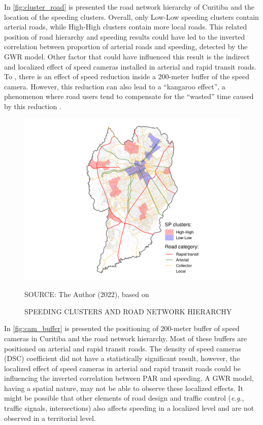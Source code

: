 In \autoref{fig:cluster_road} is presented the road network hierarchy of Curitiba and the location of the speeding clusters. Overall, only Low-Low speeding clusters contain arterial roads, while High-High clusters contain more local roads. This related position of road hierarchy and speeding results could have led to the inverted correlation between proportion of arterial roads and speeding, detected by the GWR model. Other factor that could have influenced this result is the indirect and localized effect of speed cameras installed in arterial and rapid transit roads. To \textcite{Li2013a, Oliveira2015}, there is an effect of speed reduction inside a 200-meter buffer of the speed camera. However, this reduction can also lead to a ``kangaroo effect'', a phenomenon where road users tend to compensate for the ``wasted'' time caused by this reduction \cite{Amancio2021,Li2020}. 

\begin{figure}[!htbp]
    \footnotesize
    \captionsetup{font=footnotesize}
    \caption{SPEEDING CLUSTERS AND ROAD NETWORK HIERARCHY}
    \centering
    \includegraphics{fig/lisa_sp_roadctb.png}
    \label{fig:cluster_road}
    \par SOURCE: The Author (2022), based on \textcite{IPPUC2021}
\end{figure}

In \autoref{fig:cam_buffer} is presented the positioning of 200-meter buffer of speed cameras in Curitiba and the road network hierarchy. Most of these buffers are positioned on arterial and rapid transit roads. The density of speed cameras (DSC) coefficient did not have a statistically significant result, however, the localized effect of speed cameras in arterial and rapid transit roads could be influencing the inverted correlation between PAR and speeding. A GWR model, having a spatial nature, may not be able to observe these localized effects. It might be possible that other elements of road design and traffic control (\textit{e.g.}, traffic signals, intersections) also affects speeding in a localized level and are not observed in a territorial level.  

